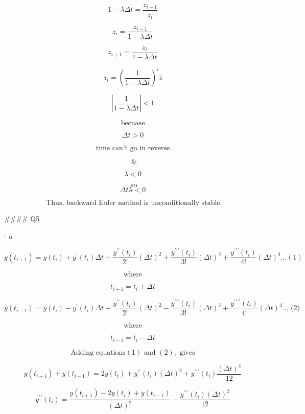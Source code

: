 $$
1-\lambda \Delta t=\frac{z_{i-1}}{z_{i}}
$$

$$
z_{i}=\frac{z_{i-1}}{1-\lambda \Delta t}
$$

$$
z_{i+1}=\frac{z_{i}}{1-\lambda \Delta t}
$$

$$
z_{i}=\left(\frac{1}{1-\lambda \Delta t}\right)^{i} \hat{z}
$$

$$
\left|\frac{1}{1-\lambda \Delta t}\right|<1
$$

$$
\text { becuase }
$$

$$
\Delta t>0
$$

$$
\text { time can't go in reverse }
$$

$$
\text { &}
$$

$$
\lambda<0
$$

$$
\text { so}
$$
$$
\Delta t\lambda<0
$$

$$
\text { Thus, backward Euler method is unconditionally
stable.}
$$

#### Q5

- a\) 


$$
y\left(t_{i+1}\right)=y\left(t_{i}\right)+y^{\prime}\left(t_{i}\right) \Delta t+\frac{y^{\prime \prime}\left(t_{i}\right)}{2 !}(\Delta t)^{2}+\frac{y^{\prime \prime \prime}\left(t_{i}\right)}{3 !}(\Delta t)^{3}+\frac{y^{\prime \prime \prime}\left(t_{i}\right)}{4 !}(\Delta t)^{4} \ldots(1)
$$


$$
\text { where } 
$$

$$
t_{i+1}=t_{i}+\Delta t
$$

$$
y\left(t_{i-1}\right)=y\left(t_{i}\right)-y^{\prime}\left(t_{i}\right) \Delta t+\frac{y^{\prime \prime}\left(t_{i}\right)}{2 !}(\Delta t)^{2}-\frac{y^{\prime \prime \prime}\left(t_{i}\right)}{3 !}(\Delta t)^{3}+\frac{y^{\prime \prime \prime \prime}\left(t_{i}\right)}{4 !}(\Delta t)^{4} \ldots \text { (2) }
$$

$$
\text { where } 
$$

$$
t_{i-1}=t_{i}-\Delta t
$$

$$
\text { Adding equations}(1)\text { and }(2), \text { gives }
$$

$$
y\left(t_{i+1}\right)+y\left(t_{i-1}\right)=2 y\left(t_{i}\right)+y^{\prime \prime}\left(t_{i}\right)(\Delta t)^{2}+y^{\prime \prime \prime}\left(t_{i}\right) \frac{(\Delta t)^{4}}{12}
$$

$$
y^{\prime \prime}\left(t_{i}\right)=\frac{y\left(t_{i+1}\right)-2 y\left(t_{i}\right)+y\left(t_{i-1}\right)}{(\Delta t)^{2}}-\frac{y^{\prime \prime \prime}\left(t_{i}\right)(\Delta t)^{2}}{12}
$$

